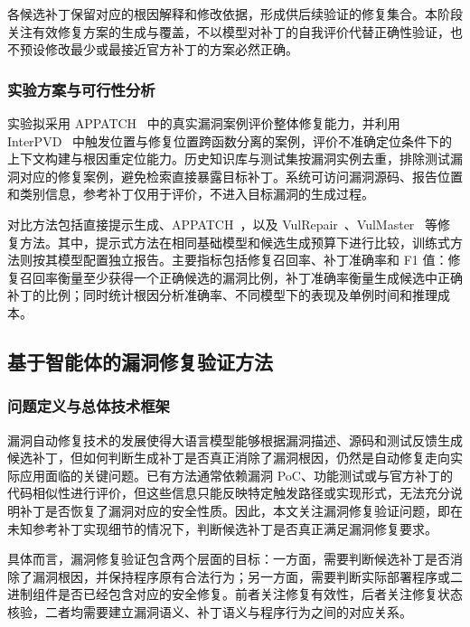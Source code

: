 各候选补丁保留对应的根因解释和修改依据，形成供后续验证的修复集合。本阶段关注有效修复方案的生成与覆盖，不以模型对补丁的自我评价代替正确性验证，也不预设修改最少或最接近官方补丁的方案必然正确。

\subsubsection{实验方案与可行性分析}
\label{sec:repair-evaluation}

实验拟采用 APPATCH~\cite{nong2025appatch} 中的真实漏洞案例评价整体修复能力，并利用 InterPVD~\cite{li2024interpvd} 中触发位置与修复位置跨函数分离的案例，评价不准确定位条件下的上下文构建与根因重定位能力。历史知识库与测试集按漏洞实例去重，排除测试漏洞对应的修复案例，避免检索直接暴露目标补丁。系统可访问漏洞源码、报告位置和类别信息，参考补丁仅用于评价，不进入目标漏洞的生成过程。

对比方法包括直接提示生成、APPATCH~\cite{nong2025appatch}，以及 VulRepair~\cite{fu2022vulrepair}、VulMaster~\cite{zhou2024vulmaster} 等修复方法。其中，提示式方法在相同基础模型和候选生成预算下进行比较，训练式方法则按其模型配置独立报告。主要指标包括修复召回率、补丁准确率和 F1 值：修复召回率衡量至少获得一个正确候选的漏洞比例，补丁准确率衡量生成候选中正确补丁的比例；同时统计根因分析准确率、不同模型下的表现及单例时间和推理成本。

\subsection{基于智能体的漏洞修复验证方法}
\label{sec:verification-method}

\subsubsection{问题定义与总体技术框架}
\label{sec:verification-framework}

漏洞自动修复技术的发展使得大语言模型能够根据漏洞描述、源码和测试反馈生成候选补丁，但如何判断生成补丁是否真正消除了漏洞根因，仍然是自动修复走向实际应用面临的关键问题。已有方法通常依赖漏洞 PoC、功能测试或与官方补丁的代码相似性进行评价，但这些信息只能反映特定触发路径或实现形式，无法充分说明补丁是否恢复了漏洞对应的安全性质。因此，本文关注漏洞修复验证问题，即在未知参考补丁实现细节的情况下，判断候选补丁是否真正满足漏洞修复要求。

具体而言，漏洞修复验证包含两个层面的目标：一方面，需要判断候选补丁是否消除了漏洞根因，并保持程序原有合法行为；另一方面，需要判断实际部署程序或二进制组件是否已经包含对应的安全修复。前者关注修复有效性，后者关注修复状态核验，二者均需要建立漏洞语义、补丁语义与程序行为之间的对应关系。

